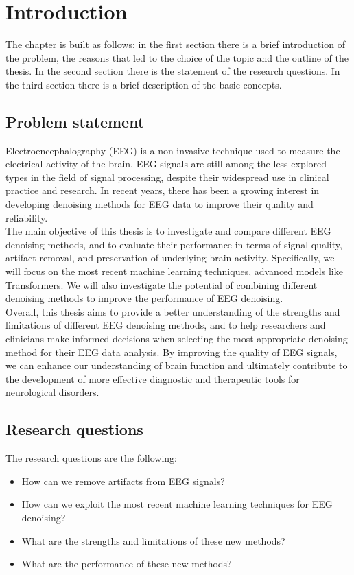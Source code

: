 \documentclass[a4paper, noexaminfo]{sapthesis}
\begin{document}
\chapter{Introduction}
The chapter is built as follows: in the first section there is a brief
introduction of the problem, the reasons that led to the choice of the
topic and the outline of the thesis. In the second section there is the
statement of the research questions. In the third section there is a brief
description of the basic concepts.
\section{Problem statement}
Electroencephalography (EEG) is a non-invasive technique used to 
measure the electrical activity of
the brain. EEG signals are still among the less explored types in the
field of signal processing, despite their widespread use in clinical 
practice and research. In recent years, there has been a growing 
interest in developing denoising methods for EEG data to improve their 
quality and reliability.\newline \\
The main objective of this thesis is to investigate and compare different
 EEG denoising methods, and to evaluate their performance in terms of 
 signal quality, artifact removal, and preservation of underlying brain
activity. Specifically, we will focus on the most recent machine learning
techniques, advanced models like Transformers. We will also investigate the 
potential of combining different denoising methods to improve the 
performance of EEG denoising.\newline \\
Overall, this thesis aims to provide a better understanding of the strengths
 and limitations of different EEG denoising methods, and to help researchers
  and clinicians make informed decisions when selecting the most appropriate
   denoising method for their EEG data analysis. By improving the quality of
    EEG signals, we can enhance our understanding of brain function and 
    ultimately contribute to the development of more effective diagnostic 
    and therapeutic tools for neurological disorders.
\section{Research questions}
The research questions are the following:
\begin{itemize}
\item How can we remove artifacts from EEG signals?
\item How can we exploit the most recent machine learning techniques for
    EEG denoising?
\item What are the strengths and limitations of these new methods?
\item What are the performance of these new methods?
\end{itemize}
\end{document}

